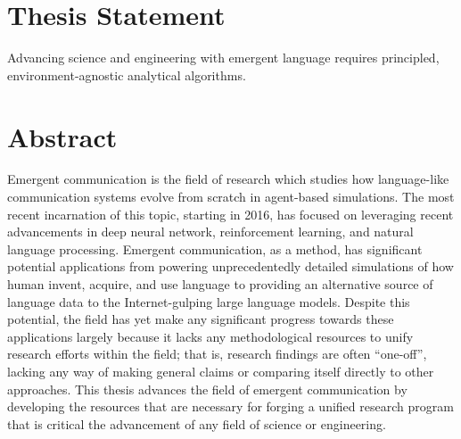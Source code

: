 






\newpage
\thispagestyle{plain}
\section*{Thesis Statement}
Advancing science and engineering with emergent language requires principled, environment-agnostic analytical algorithms.

\section*{Abstract}
Emergent communication is the field of research which studies how language-like communication systems evolve from scratch in agent-based simulations.
The most recent incarnation of this topic, starting in 2016, has focused on leveraging recent advancements in deep neural network, reinforcement learning, and natural language processing.
Emergent communication, as a method, has significant potential applications from powering unprecedentedly detailed simulations of how human invent, acquire, and use language to providing an alternative source of language data to the Internet-gulping large language models.
Despite this potential, the field has yet make any significant progress towards these applications largely because it lacks any methodological resources to unify research efforts within the field;
  that is, research findings are often ``one-off'', lacking any way of making general claims or comparing itself directly to other approaches.
This thesis advances the field of emergent communication by developing the resources that are necessary for forging a unified research program that is critical the advancement of any field of science or engineering.

